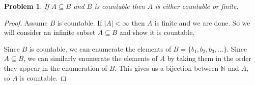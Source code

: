 \documentclass[12pt]{article}
\newtheorem{problem}{Problem}
\newcommand{\NN}{\ensuremath{\mathbb N}}
\begin{document}
\begin{problem} %
If $A\subseteq B$ and $B$ is countable then $A$ is either countable or finite.
\end{problem}


\begin{proof}
Assume $B$ is countable.  If $|A|<\infty$ then $A$ is finite and we are done.  So we will consider an infinite subset $A\subseteq B$ and show it is countable.

Since $B$ is countable, we can enumerate the elements of $B = \{b_1, b_2, b_3, \dots\}$. Since $A \subseteq B$, we can similarly enumerate the elements of $A$ by taking them in the order they appear in the enumeration of $B$. This gives us a bijection between $\NN$ and $A$, so $A$ is countable.
\end{proof}
\end{document}
